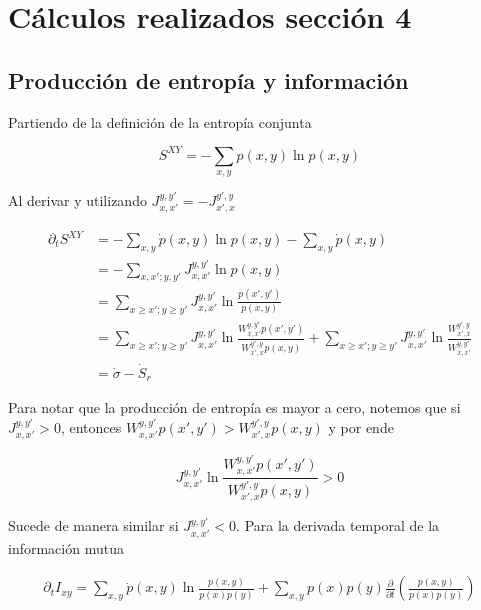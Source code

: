 \begin{appendixs}
\label{apendix:thermolaws}

\newpage 

    \section{Cálculos realizados sección 4}
    \subsection{Producción de entropía y información}
    Partiendo de la definición de la entropía conjunta

    \begin{equation*}
        S^{XY} = - \sum_{x,y}p(x,y) \ln p(x,y)
    \end{equation*}

    Al derivar y utilizando $J_{x,x'}^{y,y'} = - J_{x',x}^{y',y}$

    \begin{align*}
        \partial_{t}S^{XY} & = - \sum_{x,y} \dot{p}(x,y) \ln p(x,y) - \sum_{x,y} \dot{p}(x,y) \\
                           & = - \sum_{x,x';y,y'} J_{x,x'}^{y,y'} \ln p(x,y)  \\
                           & = \sum_{x \geq x'; y\geq y'} J_{x,x'}^{y,y'} \ln \frac{p(x',y')}{p(x,y)} \\
                           & = \sum_{x \geq x'; y\geq y'} J_{x,x'}^{y,y'} \ln \frac{W_{x,x'}^{y,y'} p(x',y')}{W_{x',x}^{y',y} p(x,y)} +  \sum_{x \geq x'; y\geq y'} J_{x,x'}^{y,y'} \ln \frac{W_{x',x}^{y',y} }{W_{x,x'}^{y,y'} } \\
                           & = \dot{\sigma} - \dot{S}_{r}
    \end{align*}

Para notar que la producción de entropía es mayor a cero, notemos que si $J_{x,x'}^{y,y'} > 0$, entonces $W_{x,x'}^{y,y'}p(x',y') > W_{x',x}^{y',y}p(x,y) $  y por ende

\begin{equation*}
    J_{x,x'}^{y,y'} \ln \frac{ W_{x,x'}^{y,y'}p(x',y') }{ W_{x',x}^{y',y}p(x,y) } > 0
\end{equation*}

Sucede de manera similar si $J_{x,x'}^{y,y'}<0$. Para la derivada temporal de la información mutua 

\begin{align*}
    \partial_{t} I_{xy} = \sum_{x,y}\dot{p}(x,y) \ln \frac{p(x,y) }{ p(x)p(y) } + \sum_{x,y}p(x)p(y) \frac{\partial}{\partial t} \left( \frac{p(x,y)}{p(x)p(y)} \right)
 \end{align*}


\end{appendixs}
